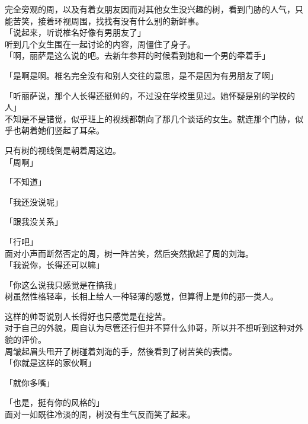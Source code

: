 完全旁观的周，以及有着女朋友因而对其他女生没兴趣的树，看到门胁的人气，只能苦笑，接着环视周围，找找有没有什么别的新鲜事。\\

「说起来，听说椎名好像有男朋友了」\\

听到几个女生围在一起讨论的内容，周僵住了身子。\\

「啊，丽萨是这么说的吧。去新年参拜的时候看到她和一个男的牵着手」

「是啊是啊。椎名完全没有和别人交往的意思，是不是因为有男朋友了啊」

「听丽萨说，那个人长得还挺帅的，不过没在学校里见过。她怀疑是别的学校的人」\\

不知是不是错觉，似乎班上的视线都朝向了那几个谈话的女生。就连那个门胁，似乎也朝着她们竖起了耳朵。

只有树的视线倒是朝着周这边。\\

「周啊」

「不知道」

「我还没说呢」

「跟我没关系」

「行吧」\\

面对小声而断然否定的周，树一阵苦笑，然后突然掀起了周的刘海。\\

「我说你，长得还可以嘛」

「你这么说我只感觉是在搞我」\\

树虽然性格轻率，长相上给人一种轻薄的感觉，但算得上是帅的那一类人。

这样的帅哥说别人长得好也只感觉是在挖苦。\\

对于自己的外貌，周自认为尽管还行但并不算什么帅哥，所以并不想听到这种对外貌的评价。\\

周皱起眉头甩开了树碰着刘海的手，然後看到了树苦笑的表情。\\

「你就是这样的家伙啊」

「就你多嘴」

「也是，挺有你的风格的」\\

面对一如既往冷淡的周，树没有生气反而笑了起来。\\

\vspace{2\baselineskip}

